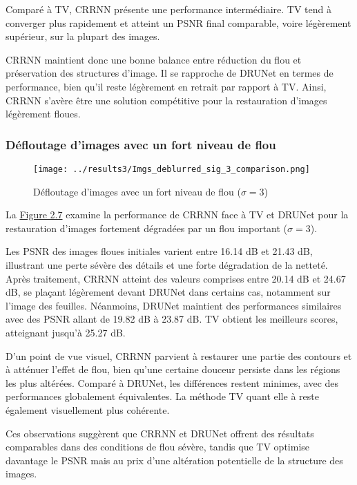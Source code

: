 \documentclass[a4paper, 12pt]{report} %
\begin{document}
Comparé à TV, CRRNN présente une performance intermédiaire. TV tend à converger plus rapidement et atteint un PSNR final comparable, voire légèrement supérieur, sur la plupart des images.

CRRNN maintient donc une bonne balance entre réduction du flou et préservation des structures d’image. Il se rapproche de DRUNet en termes de performance, bien qu’il reste légèrement en retrait par rapport à TV. Ainsi, CRRNN s’avère être une solution compétitive pour la restauration d’images légèrement floues.

\subsubsection{Défloutage d'images avec un fort niveau de flou}
\begin{figure}[H]
\centering
\begin{adjustbox}{width=1.1 \linewidth, totalheight=0.47 \textheight, angle=0, scale= 0.85, minipage= 4.2\linewidth, margin= 0}
    \texttt{[image: ../results3/Imgs\_deblurred\_sig\_3\_comparison.png]}
\end{adjustbox}
    \caption{Défloutage d'images avec un fort niveau de flou  (\(\sigma = 3\))}
    \label{fig:18}
\end{figure}

La \hyperref[fig:18]{Figure 2.7} examine la performance de CRRNN face à TV et DRUNet pour la restauration d’images fortement dégradées par un flou important (\(\sigma = 3\)).

Les PSNR des images floues initiales varient entre 16.14 dB et 21.43 dB, illustrant une perte sévère des détails et une forte dégradation de la netteté. Après traitement, CRRNN atteint des valeurs comprises entre 20.14 dB et 24.67 dB, se plaçant légèrement devant DRUNet dans certains cas, notamment sur l’image des feuilles. Néanmoins, DRUNet maintient des performances similaires avec des PSNR allant de 19.82 dB à 23.87 dB. TV obtient les meilleurs scores, atteignant jusqu’à 25.27 dB.

D’un point de vue visuel, CRRNN parvient à restaurer une partie des contours et à atténuer l’effet de flou, bien qu’une certaine douceur persiste dans les régions les plus altérées. Comparé à DRUNet, les différences restent minimes, avec des performances globalement équivalentes. La méthode TV quant elle à reste également visuellement plus cohérente.

Ces observations suggèrent que CRRNN et DRUNet offrent des résultats comparables dans des conditions de flou sévère, tandis que TV optimise davantage le PSNR mais au prix d’une altération potentielle de la structure des images.
\end{document}
